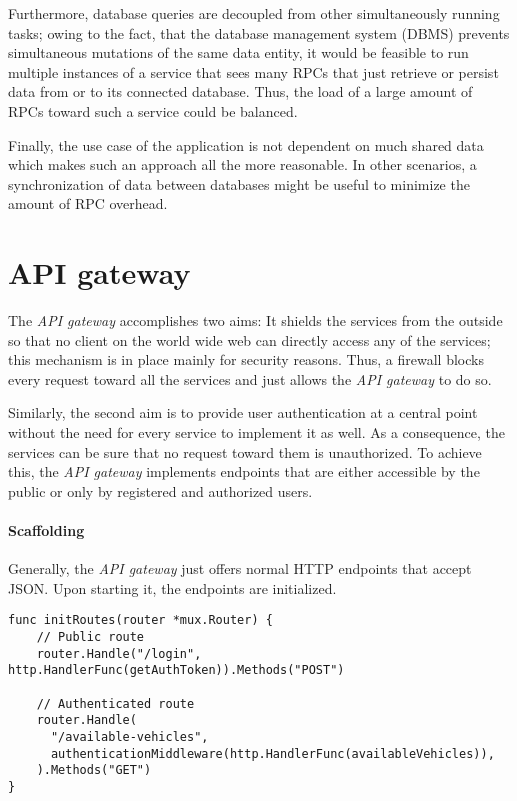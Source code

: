 \documentclass[12pt,a4paper,twoside]{report}
\begin{document}
Furthermore, database queries are decoupled from other simultaneously running tasks;
owing to the fact, that the database management system (DBMS) prevents
simultaneous mutations of the same data entity, it would be feasible
to run multiple instances of a service that sees many RPCs that just
retrieve or persist data from or to its connected database.
Thus, the load of a large amount of RPCs toward such a service could be balanced.

Finally, the use case of the application is not dependent on much
shared data which makes such an approach all the more reasonable.
In other scenarios, a synchronization of data between databases might be useful
to minimize the amount of RPC overhead.


\section{API gateway} \label{sect:api-gateway}

The \textit{API gateway} accomplishes two aims:
It shields the services from the outside so that no client on the world wide web
can directly access any of the services; this mechanism is in place mainly for
security reasons.
Thus, a firewall blocks every request toward all the services and just allows
the \textit{API gateway} to do so.

Similarly, the second aim is to provide user authentication
at a central point without the need for every service to implement it as well.
As a consequence, the services can be sure that no request toward them is unauthorized.
To achieve this, the \textit{API gateway} implements endpoints that are either
accessible by the public or only by registered and authorized users.

\paragraph{Scaffolding}
Generally, the \textit{API gateway} just offers normal HTTP endpoints that accept
JSON. Upon starting it, the endpoints are initialized.

\begin{lstlisting}[title=api-gateway/main.go, float, floatplacement=H]
func initRoutes(router *mux.Router) {
	// Public route
	router.Handle("/login", http.HandlerFunc(getAuthToken)).Methods("POST")

	// Authenticated route
	router.Handle(
      "/available-vehicles",
      authenticationMiddleware(http.HandlerFunc(availableVehicles)),
    ).Methods("GET")
}
\end{lstlisting}
\end{document}

